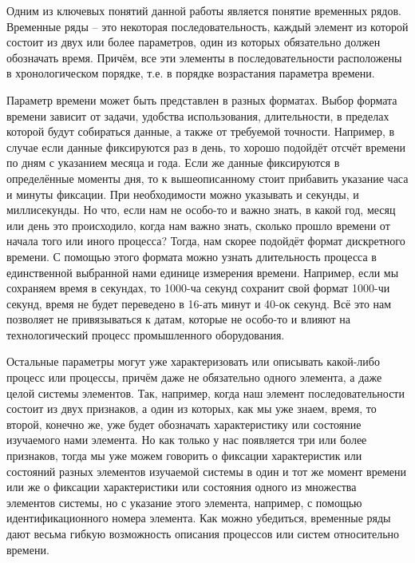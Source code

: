 {\gostFont
	
	\par \redline Одним из ключевых понятий данной работы является понятие временных рядов. Временные ряды {--} это некоторая последовательность, каждый элемент из которой состоит из двух или более параметров, один из которых обязательно должен обозначать время. Причём, все эти элементы в последовательности расположены в хронологическом порядке, т.е. в порядке возрастания параметра времени. 
	
	\par \redline Параметр времени может быть представлен в разных форматах. Выбор формата времени зависит от задачи, удобства использования, длительности, в пределах которой будут собираться данные, а также от требуемой точности. Например, в случае если данные фиксируются раз в день, то хорошо подойдёт отсчёт времени по дням с указанием месяца и года. Если же данные фиксируются в определённые моменты дня, то к вышеописанному стоит прибавить указание часа и минуты фиксации. При необходимости можно указывать и секунды, и миллисекунды. Но что, если нам не особо-то и важно знать, в какой год, месяц или день это происходило, когда нам важно знать, сколько прошло времени от начала того или иного процесса? Тогда, нам скорее подойдёт формат дискретного времени. С помощью этого формата можно узнать длительность процесса в единственной выбранной нами единице измерения времени. Например, если мы сохраняем время в секундах, то 1000-ча секунд сохранит свой формат 1000-чи секунд, время не будет переведено в 16-ать минут и 40-ок секунд. Всё это нам позволяет не привязываться к датам, которые не особо-то и влияют на технологический процесс промышленного оборудования.
	
	\par \redline Остальные параметры могут уже характеризовать или описывать какой-либо процесс или процессы, причём даже не обязательно одного элемента, а даже целой системы элементов. Так, например, когда наш элемент последовательности состоит из двух признаков, а один из которых, как мы уже знаем, время, то второй, конечно же, уже будет обозначать характеристику или состояние изучаемого нами элемента. Но как только у нас появляется три или более признаков, тогда мы уже можем говорить о фиксации характеристик или состояний разных элементов изучаемой системы в один и тот же момент времени или же о фиксации характеристики или состояния одного из множества элементов системы, но с указание этого элемента, например, с помощью идентификационного номера элемента. Как можно убедиться, временные ряды дают весьма гибкую возможность описания процессов или систем относительно времени. 
	
}
